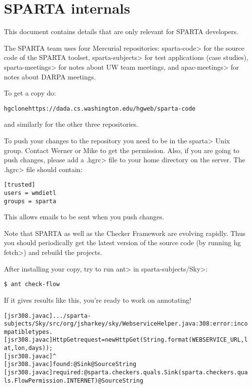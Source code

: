 \htmlhr
\chapter{SPARTA internals\label{sparta-internals}}

This document contains details that are only relevant for
SPARTA developers.

The SPARTA team uses four Mercurial repositories:
\<sparta-code> for the source code of the SPARTA toolset,
\<sparta-subjects> for test applications (case studies),
\<sparta-meetings> for notes about UW team meetings, and
\<apac-meetings> for notes about DARPA meetings.

To get a copy do:

\begin{alltt}
hg clone https://dada.cs.washington.edu/hgweb/sparta-code
\end{alltt}

\noindent
and similarly for the other three repositories.

To push your changes to the repository you need to be in the \<sparta> Unix
group. Contact Werner or Mike to get the permission.  Also, if you are
going to push changes, please add a \<.hgrc> file to your home directory on
the server.  The \<.hgrc> file should contain:

\begin{verbatim} 
[trusted]
users = wmdietl
groups = sparta
\end{verbatim}

This allows emails to be sent when you push changes. 

Note that SPARTA as well as the Checker Framework are evolving
rapidly.
Thus you should periodically get the latest version of the source code (by
running \<hg fetch>) and
rebuild the projects.


After installing your copy, try to run \<ant> in \<sparta-subjects/Sky>:

\begin{Verbatim}
$ ant check-flow
\end{Verbatim}

If it gives results like this, you're ready to work on annotating!

\begin{smaller}
\begin{alltt}
[jsr308.javac] .../sparta-subjects/Sky/src/org/jsharkey/sky/WebserviceHelper.java:308: error: incompatible types.
[jsr308.javac]             HttpGet request = new HttpGet(String.format(WEBSERVICE_URL, lat, lon, days));
[jsr308.javac]                                                        ^
[jsr308.javac]   found   : @Sink @Source String
[jsr308.javac]   required: @sparta.checkers.quals.Sink({sparta.checkers.quals.FlowPermission.INTERNET}) @Source String
\end{alltt}
\end{smaller}

